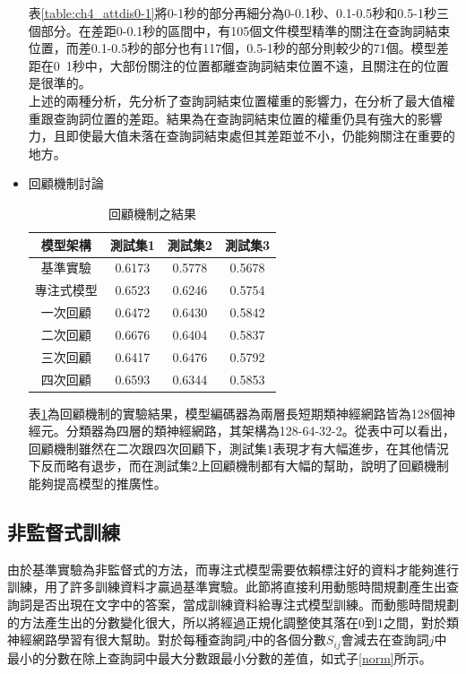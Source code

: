 \begin{itemize}
表\ref{table:ch4_attdis0-1}將0-1秒的部分再細分為0-0.1秒、0.1-0.5秒和0.5-1秒三個部分。在差距0-0.1秒的區間中，有105個文件模型精準的關注在查詢詞結束位置，而差0.1-0.5秒的部分也有117個，0.5-1秒的部分則較少的71個。模型差距在0~1秒中，大部份關注的位置都離查詢詞結束位置不遠，且關注在的位置是很準的。
\\

上述的兩種分析，先分析了查詢詞結束位置權重的影響力，在分析了最大值權重跟查詢詞位置的差距。結果為在查詢詞結束位置的權重仍具有強大的影響力，且即使最大值未落在查詢詞結束處但其差距並不小，仍能夠關注在重要的地方。

\item{回顧機制討論}

\begin{table}[hb]
	 \centering
	 \caption{回顧機制之結果}
	 \label{table:ch4_hop}
	 \begin{tabular}{|c|c|c|c|c|}
		 \hline
		 \multicolumn{2}{|c|}{模型架構} & 測試集1 & 測試集2 & 測試集3 \\
		 \hline
		 \multicolumn{2}{|c|}{基準實驗} & 0.6173 & 0.5778 & 0.5678\\
		 \hline
		 \multicolumn{2}{|c|}{專注式模型} &0.6523 &0.6246 & 0.5754 \\
		 \hline
		 \multicolumn{2}{|c|}{一次回顧} &0.6472 &0.6430 & 0.5842 \\
		 \hline
		 \multicolumn{2}{|c|}{二次回顧} &{\color{red}0.6676}&0.6404 & 0.5837 \\
		 \hline
		 \multicolumn{2}{|c|}{三次回顧} &0.6417&0.6476 & 0.5792 \\
		 \hline
		 \multicolumn{2}{|c|}{四次回顧} &0.6593& 0.6344 &0.5853\\
		 \hline
	   \end{tabular}
\end{table}
表\ref{table:ch4_hop}為回顧機制的實驗結果，模型編碼器為兩層長短期類神經網路皆為128個神經元。分類器為四層的類神經網路，其架構為128-64-32-2。從表中可以看出，回顧機制雖然在二次跟四次回顧下，測試集$1$表現才有大幅進步，在其他情況下反而略有退步，而在測試集$2$上回顧機制都有大幅的幫助，說明了回顧機制能夠提高模型的推廣性。


\end{itemize}
\vspace{10cm}
\subsection{非監督式訓練}

由於基準實驗為非監督式的方法，而專注式模型需要依賴標注好的資料才能夠進行訓練，用了許多訓練資料才贏過基準實驗。此節將直接利用動態時間規劃產生出查詢詞是否出現在文字中的答案，當成訓練資料給專注式模型訓練。而動態時間規劃的方法產生出的分數變化很大，所以將經過正規化調整使其落在$0$到$1$之間，對於類神經網路學習有很大幫助。對於每種查詢詞$j$中的各個分數$S_{ij}$會減去在查詢詞$j$中最小的分數在除上查詢詞中最大分數跟最小分數的差值，如式子\ref{norm}所示。

